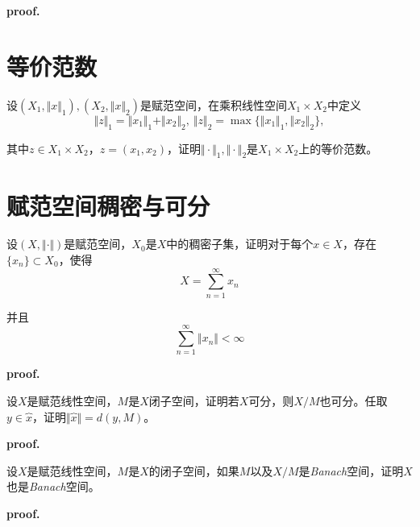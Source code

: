 \textbf{proof.}

\section{等价范数}

\begin{mdframed}
    \begin{question}
        设$(X_1,\Vert x\Vert_1),(X_2,\Vert x\Vert_2)$是赋范空间，在乘积线性空间$X_1\times X_2$中定义
        \begin{equation}
            \Vert z\Vert_1=\Vert x_1\Vert_1+\Vert x_2\Vert_2,\ \Vert z\Vert_2=\max\{\Vert x_1\Vert_1,\Vert x_2\Vert_2\},
        \end{equation}

        其中$z\in X_1\times X_2$，$z=(x_1,x_2)$，证明$\Vert\cdot\Vert_1,\Vert\cdot\Vert_2$是$X_1\times X_2$上的等价范数。
    \end{question}
\end{mdframed}

\section{赋范空间稠密与可分}

\begin{mdframed}
    \begin{question}
        设$(X,\Vert\cdot\Vert)$是赋范空间，$X_0$是$X$中的稠密子集，证明对于每个$x\in X$，存在$\{x_n\}\subset X_0$，使得
        \begin{equation}
            X=\sum_{n=1}^{\infty}x_n
        \end{equation}

        并且
        \begin{equation}
            \sum_{n=1}^{\infty}\Vert x_n\Vert<\infty
        \end{equation}
    \end{question}
\end{mdframed}

\textbf{proof.}

\begin{mdframed}
    \begin{question}
        设$X$是赋范线性空间，$M$是$X$闭子空间，证明若$X$可分，则$X/M$也可分。任取$y\in \overbrace{x}$，证明$\Vert \overbrace{x}\Vert=d(y,M)$。
    \end{question}
\end{mdframed}

\textbf{proof.}

\begin{mdframed}
    \begin{question}
        设$X$是赋范线性空间，$M$是$X$的闭子空间，如果$M$以及$X/M$是\textsl{Banach}空间，证明$X$也是\textsl{Banach}空间。
    \end{question}
\end{mdframed}

\textbf{proof.}
